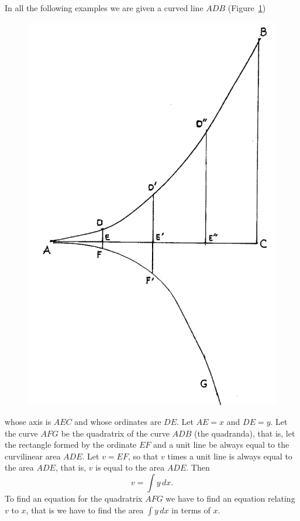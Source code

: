 \documentclass[polutonikogreek,english,twoside,openright]{article}
\begin{document}
In all the following examples we are given a curved line $ADB$ (Figure~\ref{algquad})
\begin{figure}[htp]
\begin{center}
\includegraphics[width=.9\textwidth]{fig/Figure46}
\caption{}
\label{algquad}
\vspace{-10pt}
\end{center}
\end{figure}  whose axis is $AEC$ and whose ordinates are $DE$.  Let $AE = x$ and $DE = y$.  Let the curve $AFG$ be the quadratrix of the curve $ADB$ (the quadranda), that is, let the rectangle formed by the ordinate $EF$ and a unit line be always equal to the curvilinear area $ADE$.  Let $v = EF$, so that $v$ times a unit line is always equal to the area $ADE$, that is, $v$ is equal to the area $ADE$.  Then 
$$v = \int\!y\,dx.$$
To find an equation for the quadratrix $AFG$ we have to find an equation relating $v$ to $x$, that is we have to find the area $\int\! y\,dx$  in terms of $x$.  
\end{document}

